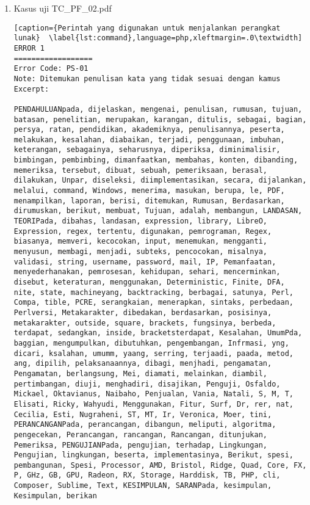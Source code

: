 \begin{enumerate}
	\item Kasus uji TC\_PF\_02.pdf

\begin{lstlisting}[caption={Perintah yang digunakan untuk menjalankan perangkat lunak}	\label{lst:command},language=php,xleftmargin=.0\textwidth]
ERROR 1
==================
Error Code: PS-01
Note: Ditemukan penulisan kata yang tidak sesuai dengan kamus
Excerpt: 

PENDAHULUANpada, dijelaskan, mengenai, penulisan, rumusan, tujuan, batasan, penelitian, merupakan, karangan, ditulis, sebagai, bagian, persya, ratan, pendidikan, akademiknya, penulisannya, peserta, melakukan, kesalahan, diabaikan, terjadi, penggunaan, imbuhan, keterangan, sebagainya, seharusnya, diperiksa, diminimalisir, bimbingan, pembimbing, dimanfaatkan, membahas, konten, dibanding, memeriksa, tersebut, dibuat, sebuah, pemeriksaan, berasal, dilakukan, Unpar, diseleksi, diimplementasikan, secara, dijalankan, melalui, command, Windows, menerima, masukan, berupa, le, PDF, menampilkan, laporan, berisi, ditemukan, Rumusan, Berdasarkan, dirumuskan, berikut, membuat, Tujuan, adalah, membangun, LANDASAN, TEORIPada, dibahas, landasan, expression, library, LibreO, Expression, regex, tertentu, digunakan, pemrograman, Regex, biasanya, memveri, kecocokan, input, menemukan, mengganti, menyusun, membagi, menjadi, subteks, pencocokan, misalnya, validasi, string, username, password, mail, IP, Pemanfaatan, menyederhanakan, pemrosesan, kehidupan, sehari, mencerminkan, disebut, keteraturan, menggunakan, Deterministic, Finite, DFA, nite, state, machineyang, backtracking, berbagai, satunya, Perl, Compa, tible, PCRE, serangkaian, menerapkan, sintaks, perbedaan, Perlversi, Metakarakter, dibedakan, berdasarkan, posisinya, metakarakter, outside, square, brackets, fungsinya, berbeda, terdapat, sedangkan, inside, bracketsterdapat, Kesalahan, UmumPda, baggian, mengumpulkan, dibutuhkan, pengembangan, Infrmasi, yng, dicari, ksalahan, umumm, yaang, serring, terjaadi, paada, metod, ang, dipilih, pelaksanaannya, dibagi, menjhadi, pengamatan, Pengamatan, berlangsung, Mei, diamati, melainkan, diambil, pertimbangan, diuji, menghadiri, disajikan, Penguji, Osfaldo, Mickael, Oktavianus, Naibaho, Penjualan, Vania, Natali, S, M, T, Elisati, Ricky, Wahyudi, Menggunakan, Fitur, Surf, Dr, rer, nat, Cecilia, Esti, Nugraheni, ST, MT, Ir, Veronica, Moer, tini, PERANCANGANPada, perancangan, dibangun, meliputi, algoritma, pengecekan, Perancangan, rancangan, Rancangan, ditunjukan, Pemeriksa, PENGUJIANPada, pengujian, terhadap, Lingkungan, Pengujian, lingkungan, beserta, implementasinya, Berikut, spesi, pembangunan, Spesi, Processor, AMD, Bristol, Ridge, Quad, Core, FX, P, GHz, GB, GPU, Radeon, RX, Storage, Harddisk, TB, PHP, cli, Composer, Sublime, Text, KESIMPULAN, SARANPada, kesimpulan, Kesimpulan, berikan
\end{lstlisting}
\end{enumerate}

